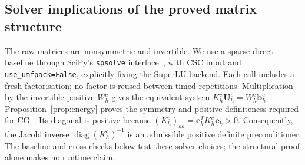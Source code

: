 \subsection{Solver implications of the proved matrix structure}
\label{sec:solver-implications}

The raw matrices are nonsymmetric and invertible. We use a sparse direct
baseline through SciPy's \texttt{spsolve} interface~\cite{scipyspsolve},
with CSC input and \texttt{use\_umfpack=False}, explicitly fixing the
SuperLU backend. Each call includes a fresh factorisation; no factor is
reused between timed repetitions.
Multiplication by the invertible positive $W_h^c$ gives the equivalent
system $K_h^c\boldsymbol U_h^c=W_h^c\boldsymbol b_h^c$.
Proposition~\ref{prop:energy} proves the symmetry and positive
definiteness required for CG~\cite{scipycg}. Its diagonal is positive
because $(K_h^c)_{kk}=\boldsymbol e_k^TK_h^c\boldsymbol e_k>0$.
Consequently, the Jacobi inverse
$\operatorname{diag}(K_h^c)^{-1}$ is an admissible positive definite
preconditioner. The baseline and cross-checks below test these solver
choices; the structural proof alone makes no runtime claim.
